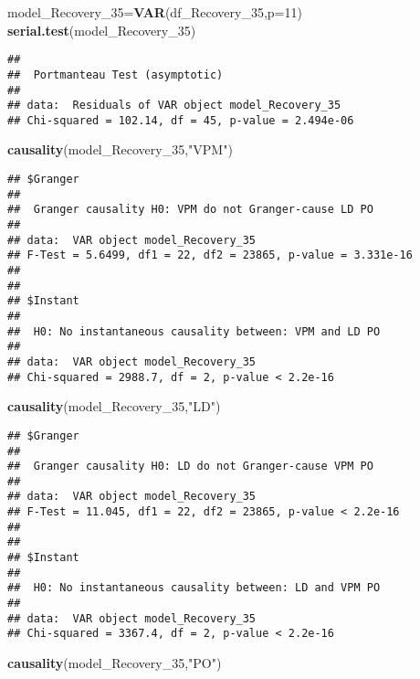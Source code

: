 \documentclass[
]{article}
\newenvironment{Shaded}{\begin{snugshade}}{\end{snugshade}}
\newcommand{\AttributeTok}[1]{\textcolor[rgb]{0.13,0.29,0.53}{#1}}
\newcommand{\DecValTok}[1]{\textcolor[rgb]{0.00,0.00,0.81}{#1}}
\newcommand{\FunctionTok}[1]{\textcolor[rgb]{0.13,0.29,0.53}{\textbf{#1}}}
\newcommand{\NormalTok}[1]{#1}
\newcommand{\OtherTok}[1]{\textcolor[rgb]{0.56,0.35,0.01}{#1}}
\newcommand{\StringTok}[1]{\textcolor[rgb]{0.31,0.60,0.02}{#1}}
\begin{document}
\begin{Shaded}
\begin{Highlighting}[]
\NormalTok{model\_Recovery\_35}\OtherTok{=}\FunctionTok{VAR}\NormalTok{(df\_Recovery\_35,}\AttributeTok{p=}\DecValTok{11}\NormalTok{)}
\FunctionTok{serial.test}\NormalTok{(model\_Recovery\_35)}
\end{Highlighting}
\end{Shaded}

\begin{verbatim}
## 
##  Portmanteau Test (asymptotic)
## 
## data:  Residuals of VAR object model_Recovery_35
## Chi-squared = 102.14, df = 45, p-value = 2.494e-06
\end{verbatim}

\begin{Shaded}
\begin{Highlighting}[]
\FunctionTok{causality}\NormalTok{(model\_Recovery\_35,}\StringTok{"VPM"}\NormalTok{)}
\end{Highlighting}
\end{Shaded}

\begin{verbatim}
## $Granger
## 
##  Granger causality H0: VPM do not Granger-cause LD PO
## 
## data:  VAR object model_Recovery_35
## F-Test = 5.6499, df1 = 22, df2 = 23865, p-value = 3.331e-16
## 
## 
## $Instant
## 
##  H0: No instantaneous causality between: VPM and LD PO
## 
## data:  VAR object model_Recovery_35
## Chi-squared = 2988.7, df = 2, p-value < 2.2e-16
\end{verbatim}

\begin{Shaded}
\begin{Highlighting}[]
\FunctionTok{causality}\NormalTok{(model\_Recovery\_35,}\StringTok{"LD"}\NormalTok{)}
\end{Highlighting}
\end{Shaded}

\begin{verbatim}
## $Granger
## 
##  Granger causality H0: LD do not Granger-cause VPM PO
## 
## data:  VAR object model_Recovery_35
## F-Test = 11.045, df1 = 22, df2 = 23865, p-value < 2.2e-16
## 
## 
## $Instant
## 
##  H0: No instantaneous causality between: LD and VPM PO
## 
## data:  VAR object model_Recovery_35
## Chi-squared = 3367.4, df = 2, p-value < 2.2e-16
\end{verbatim}

\begin{Shaded}
\begin{Highlighting}[]
\FunctionTok{causality}\NormalTok{(model\_Recovery\_35,}\StringTok{"PO"}\NormalTok{)}
\end{Highlighting}
\end{Shaded}
\end{document}
